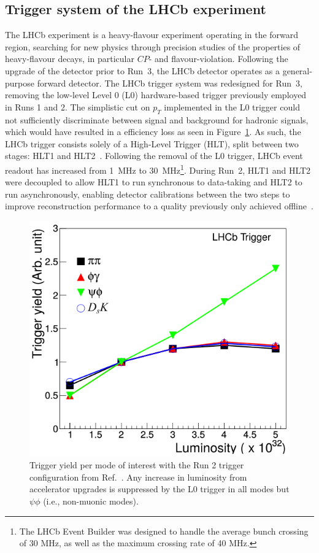\subsection{Trigger system of the LHCb experiment}

The LHCb experiment is a heavy-flavour experiment operating in the forward region, searching for new physics through precision studies of the properties of heavy-flavour decays, in particular $CP$- and flavour-violation. Following the upgrade of the detector prior to Run~3, the LHCb detector operates as a general-purpose forward detector. The LHCb trigger system was redesigned for Run~3, removing the low-level Level 0 (L0) hardware-based trigger previously employed in Runs 1 and 2. The simplistic cut on $p_{T}$ implemented in the L0 trigger could not sufficiently discriminate between signal and background for hadronic signals, which would have resulted in a efficiency loss as seen in Figure~\ref{fig:LHCbL0TriggerYield}. As such, the LHCb trigger consists solely of a High-Level Trigger (HLT), split between two stages: HLT1 and HLT2~\cite{Aaij:2019uij}. Following the removal of the L0 trigger, LHCb event readout has increased from \SI{1}{\mega\hertz} to \SI{30}{\mega\hertz}\footnote{The LHCb Event Builder was designed to handle the average bunch crossing of 30 MHz, as well as the maximum crossing rate of 40 MHz.}. During Run~2, HLT1 and HLT2 were decoupled to allow HLT1 to run synchronous to data-taking and HLT2 to run asynchronously, enabling detector calibrations between the two steps to improve reconstruction performance to a quality previously only achieved offline~\cite{LHCb:Albrecht_2015}. 

\begin{figure}[h!]
    \centering
    \includegraphics[width=0.55\linewidth]{images/lhcb/LHCb-L0-yield.png}
    \caption{Trigger yield per mode of interest with the Run 2 trigger configuration from Ref.~\cite{LHCb:upgrade-piucci}. Any increase in luminosity from accelerator upgrades is suppressed by the L0 trigger in all modes but $\psi\phi$ (i.e., non-muonic modes).}
    \label{fig:LHCbL0TriggerYield}
\end{figure}

